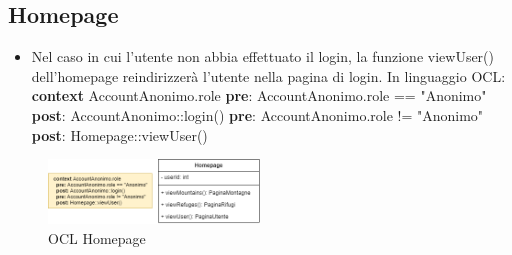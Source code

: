 \documentclass[a4paper,12pt]{article}
\begin{document}
\subsection{Homepage}
\begin{itemize}
    \item Nel caso in cui l'utente non abbia effettuato il login, la funzione viewUser() dell'homepage reindirizzerà l'utente nella pagina di login. \newline \newline In linguaggio OCL:\newline
    \textbf{context} AccountAnonimo.role \newline
    \textbf{pre}: AccountAnonimo.role == "Anonimo"\newline
    \textbf{post}: AccountAnonimo::login()\newline
    \textbf{pre}: AccountAnonimo.role != "Anonimo" \newline
    \textbf{post}: Homepage::viewUser()
\end{itemize}

\begin{figure}[H]
   \centering
   \includegraphics[width=0.5\textwidth] {D3/img/homepage_OCL.png}
    \caption{OCL Homepage}
\end{figure}
\end{document}
